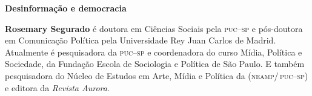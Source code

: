 \textbf{Desinformação e democracia} \lipsum[1]

\textbf{Rosemary Segurado} é doutora em Ciências Sociais pela \textsc{puc--sp} e pós-doutora em Comunicação Política pela Universidade Rey Juan Carlos de Madrid. Atualmente é pesquisadora da \textsc{puc--sp} e coordenadora do curso Mídia, Política e Sociedade, da Fundação Escola de Sociologia e Política de São Paulo. 
E também pesquisadora do Núcleo de Estudos em Arte, Mídia e Política da (\textsc{neamp/\,puc--sp}) e editora da \textit{Revista Aurora}.



